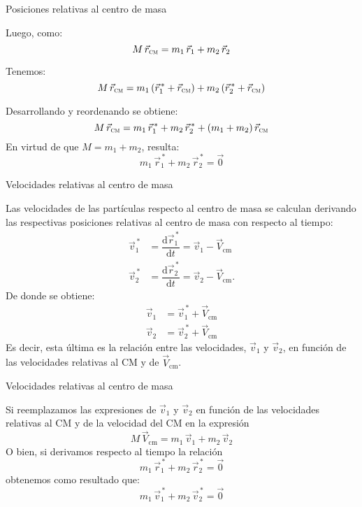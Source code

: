 \documentclass[11pt,handout,aspectratio=1610]{beamer}
\newcommand{\fdiff}[2]{\dfrac{\text{d} #1}{\text{d} #2}}
\begin{document}
\begin{frame}{Posiciones relativas al centro de masa}

    Luego, como: $$M \, \vec{r}_{\textsc{cm}} = m_1 \, \vec{r}_1 + m_2 \, \vec{r}_2$$ \pause

    Tenemos: $$M \, \vec{r}_{\textsc{cm}} = m_1 \left(\vec{r}_1^{\,\ast} + \vec{r}_{\textsc{cm}}\right) + m_2 \left(\vec{r}_2^{\,\ast} + \vec{r}_{\textsc{cm}}\right)$$ \pause

    Desarrollando y reordenando se obtiene: $$M \, \vec{r}_{\textsc{cm}} = m_1 \, \vec{r}_1^{\,\ast} + m_2 \, \vec{r}^{\,\ast}_2 + \left(m_1 +  m_2\right) \vec{r}_{\textsc{cm}}$$ \pause En virtud de que $M = m_1 + m_2$, resulta: $$m_1 \, \vec{r}_1^{\,\ast} + m_2 \, \vec{r}^{\,\ast}_2 = \vec{0}$$

\end{frame}

\begin{frame}{Velocidades relativas al centro de masa}

    Las velocidades de las partículas respecto al centro de masa se calculan derivando las respectivas posiciones relativas al centro de masa con respecto al tiempo:
    \begin{align*}
        \vec{v}_1^{\,\ast} &= \fdiff{\vec{r}_1^{\,\ast}}{t} = \vec{v}_1 - \vec{V}_\text{cm} \\
        \vec{v}_2^{\,\ast} &= \fdiff{\vec{r}_2^{\,\ast}}{t} = \vec{v}_2 - \vec{V}_\text{cm}.
    \end{align*} De donde se obtiene:
    \begin{align*}
        \vec{v}_1 &= \vec{v}_1^{\,\ast} + \vec{V}_\text{cm} \\
        \vec{v}_2 &= \vec{v}_2^{\,\ast} + \vec{V}_\text{cm} 
    \end{align*} \pause Es decir, esta última es la relación entre las velocidades, $\vec{v}_1$ y $\vec{v}_2$, en función de las velocidades relativas al CM y de $\vec{V}_\text{cm}$.
    
\end{frame}

\begin{frame}{Velocidades relativas al centro de masa}

    Si reemplazamos las expresiones de $\vec{v}_1$ y $\vec{v}_2$ en función de las velocidades relativas al CM y de la velocidad del CM en la expresión $$M \, \vec{V}_\text{cm} = m_1 \, \vec{v}_1 + m_2 \, \vec{v}_2$$ O bien, si derivamos respecto al tiempo la relación $$m_1 \, \vec{r}_1^{\,\ast} + m_2 \, \vec{r}^{\,\ast}_2 = \vec{0}$$ obtenemos como resultado que: $$m_1 \, \vec{v}_1^{\,\ast} + m_2 \, \vec{v}^{\,\ast}_2 = \vec{0}$$

\end{frame}
\end{document}

